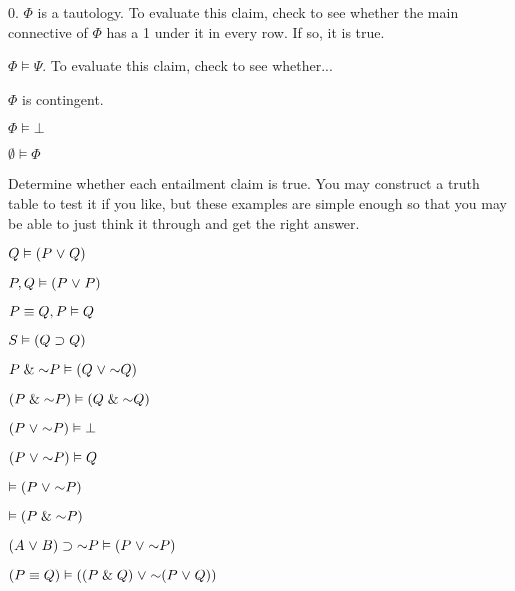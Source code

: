 \begin{earg}
		\item[0.] $\Phi$ is a tautology.
		To evaluate this claim, check to see whether the main connective of $\Phi$ has a 1 under it in every row. If so, it is true.
		\item $\Phi \models \Psi$. 
		To evaluate this claim, check to see whether... 
		
		\item $\Phi$ is contingent.
\item $\Phi \models \bot$
		\item $\emptyset \models \Phi$
	\end{earg}


\problempart
Determine whether each entailment claim is true. You may construct a truth table to test it if you like, but these examples are simple enough so that you may be able to just think it through and get the right answer.
\begin{earg}
\item $Q \vDash (P \mkern1mu\vee\mkern1mu Q)$
\item $P, Q \vDash (P \mkern1mu\vee\mkern1mu P)$
\item $P \equiv Q, P \vDash Q$ %
\item $S \vDash (Q \supset Q)$   %
\item $P \eand \enot P \models (Q \eor \enot Q)$%
\item $(P \eand \enot P) \models (Q \eand \enot Q)$
\item $(P \eor \enot P) \models \bot$
\item $(P \eor \enot P) \models Q$%
\item $\models (P \eor \enot P)$
\item $\models (P \eand \enot P)$
\item $(A \eor B) \eif \enot P \models (P \eor \enot P)$
\item $(P \eiff Q) \models ((P \eand Q) \eor \enot (P \eor Q))$
\end{earg}

\fi 

